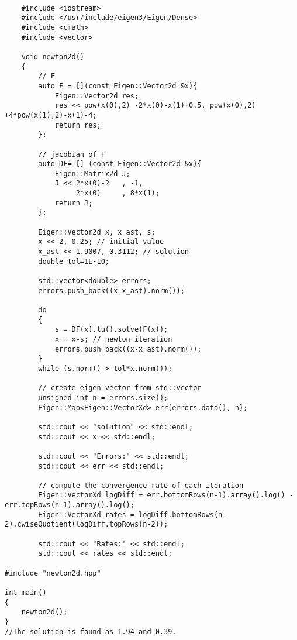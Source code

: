 \documentclass[xcolor=dvipsnames]{beamer}
\begin{document}
{
\begin{frame}[fragile,shrink=20]
	\lstset{language=C++}
\begin{lstlisting}

	#include <iostream>
	#include </usr/include/eigen3/Eigen/Dense>
	#include <cmath>
	#include <vector>

	void newton2d()
	{
		// F
		auto F = [](const Eigen::Vector2d &x){ 
	   		Eigen::Vector2d res;
			res << pow(x(0),2) -2*x(0)-x(1)+0.5, pow(x(0),2) +4*pow(x(1),2)-x(1)-4;
			return res;
		};

		// jacobian of F
		auto DF= [] (const Eigen::Vector2d &x){
			Eigen::Matrix2d J;
			J << 2*x(0)-2	, -1, 
			  	 2*x(0)		, 8*x(1);
		  	return J;
		};	

		Eigen::Vector2d x, x_ast, s;
		x << 2, 0.25; // initial value
		x_ast << 1.9007, 0.3112; // solution
	   	double tol=1E-10;

		std::vector<double> errors;
		errors.push_back((x-x_ast).norm());

		do
		{
			s = DF(x).lu().solve(F(x));
		   	x = x-s; // newton iteration
			errors.push_back((x-x_ast).norm());
		}
		while (s.norm() > tol*x.norm());

		// create eigen vector from std::vector
		unsigned int n = errors.size();
		Eigen::Map<Eigen::VectorXd> err(errors.data(), n);

		std::cout << "solution" << std::endl;
		std::cout << x << std::endl;
		
		std::cout << "Errors:" << std::endl;
		std::cout << err << std::endl;

		// compute the convergence rate of each iteration	
		Eigen::VectorXd logDiff = err.bottomRows(n-1).array().log() - err.topRows(n-1).array().log();
		Eigen::VectorXd rates = logDiff.bottomRows(n-2).cwiseQuotient(logDiff.topRows(n-2));
		
		std::cout << "Rates:" << std::endl;
		std::cout << rates << std::endl;

#include "newton2d.hpp"
  
int main()
{
	newton2d();
}
//The solution is found as 1.94 and 0.39.
\end{lstlisting}
\end{frame}
}
\end{document}
